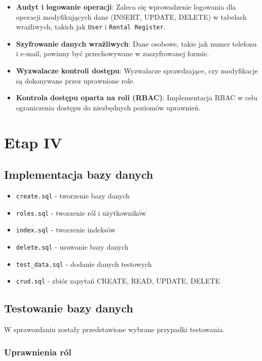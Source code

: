 \documentclass{article}
\begin{document}
\begin{itemize}
    \item \textbf{Audyt i logowanie operacji}: Zaleca się wprowadzenie logowania dla operacji modyfikujących dane (INSERT, UPDATE, DELETE) w tabelach wrażliwych, takich jak \texttt{User} i \texttt{Rental Register}.
    \item \textbf{Szyfrowanie danych wrażliwych}: Dane osobowe, takie jak numer telefonu i e-mail, powinny być przechowywane w zaszyfrowanej formie.
    \item \textbf{Wyzwalacze kontroli dostępu}: Wyzwalacze sprawdzające, czy modyfikacje są dokonywane przez uprawnione role.
    \item \textbf{Kontrola dostępu oparta na roli (RBAC)}: Implementacja RBAC w celu ograniczenia dostępu do niezbędnych poziomów uprawnień.
\end{itemize}

\section{Etap IV}

\subsection{Implementacja bazy danych}
\begin{itemize}
    \item \texttt{create.sql} - tworzenie bazy danych
    \item \texttt{roles.sql} - tworzenie ról i użytkowników
    \item \texttt{index.sql} - tworzenie indeksów
    \item \texttt{delete.sql} - usuwanie bazy danych
    \item \texttt{test\_data.sql} - dodanie danych testowych
    \item \texttt{crud.sql} - zbiór zapytań CREATE, READ, UPDATE, DELETE
\end{itemize}

\subsection{Testowanie bazy danych}
W sprawozdaniu zostały przedstawione wybrane przypadki testowania.

\subsubsection{Uprawnienia ról}
\end{document}
